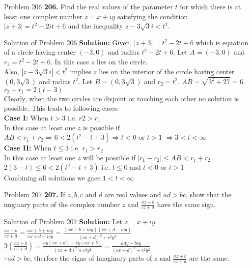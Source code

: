 \documentclass[aspectratio=169,8pt]{beamer}
\begin{document}
\begin{frame}{Problem 206}
  \textbf{206.} Find the real values of the parameter $t$ for which there is at least one complex number $z = x + iy$ satisfying
  the condition $|z + 3| = t^2 - 2it + 6$ and the inequality $z - 3\sqrt{3}i < t^2$.
\end{frame}
\begin{frame}{Solution of Problem 206}
  \textbf{Solution:} Given, $|z + 3| = t^2 - 2t + 6$ which is equation of a circle having center $(-3, 0)$ and radius $t^2 - 2t +
  6$. Let $A = (-3, 0)$ and $r_1 = t^2 - 2t + 6$. In this case $z$ lies on the circle.
  \\\vspace*{0.2cm}
  Also, $|z - 3\sqrt{3}i| < t^2$ implies $z$ lies on the interior of the circle having center $(0, 3\sqrt{3})$ and radius $t^2$.
  Let $B = (0, 3\sqrt{3})$ and $r_2 = t^2$. $AB = \sqrt{3^2 + 27} = 6$. $r_2 - r_1 = 2(t - 3)$
  \\\vspace*{0.2cm}
  Clearly, when the two circles are disjoint or touching each other no solution is possible. This leads to following cases:
  \\\vspace*{0.2cm}
  \textbf{Case I:} When $t > 3$ i.e. $r2 > r_1$
  \\\vspace*{0.2cm}
  In this case at least one $z$ is possible if $AB < r_1 + r_2 \Rightarrow 6 < 2(t^2 - t + 3)\Rightarrow t < 0$ or $t > 1$
  $\Rightarrow 3 < t <\infty$
  \\\vspace*{0.2cm}
  \textbf{Case II:} When $t \leq 3$ i.e. $r_1 > r_2$
  \\\vspace*{0.2cm}
  In this case at least one $z$ will be possible if $|r_1 - r_2| \leq AB < r_1 + r_2$
  \\\vspace*{0.2cm}
  $2(3 - t)\leq 6 < 2(t^2 - t + 3)$ i.e. $t \leq 0$ and $t < 0$ or $t > 1$
  \\\vspace*{0.2cm}
  Combining all solutions we gace $1 < t < \infty$
\end{frame}
\begin{frame}{Problem 207}
  \textbf{207.} If $a, b, c$ and $d$ are real values and $ad > bc$, show that the imginary parts of the complex number $z$ and
  $\frac{az + b}{cz + d}$ have the same sign.
\end{frame}
\begin{frame}{Solution of Problem 207}
  \textbf{Solution:} Let $z = x + iy$. $\frac{az + b}{cz + d} = \frac{ax + b + iay}{cx + d + icy} = \frac{(ax + b + iay)(cx + d -
    icy)}{(cx + d)^2 + c^2y^2}$
  \\\vspace*{0.2cm}
  $\Im\left(\frac{az + b}{cz + d}\right) = \frac{ay(cx + d) - cy(ax + b)}{(cx + d)^2 + c^2y^2} = \frac{ady - bcy}{(cx + d)^2 +
    c^2y^2}$
  \\\vspace*{0.2cm}
  $\because ad > bc$, therfore the signs of imaginary parts of $z$ and $\frac{az + b}{cz + d}$ are the same.
\end{frame}
\end{document}

